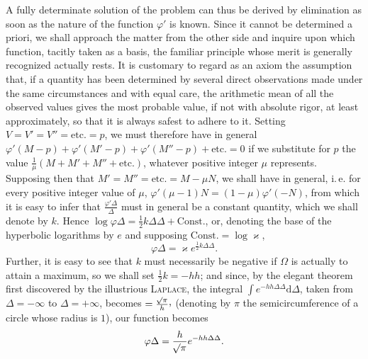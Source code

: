 A fully determinate solution of the problem can thus be derived by elimination as soon as the nature of the function $\varphi'$ is known. Since it cannot be determined a priori, we shall approach the matter from the other side and inquire upon which function, tacitly taken as a basis, the familiar principle whose merit is generally recognized actually rests. It is customary to regard as an axiom the assumption that, if a quantity has been determined by several direct observations made under the same circumstances and with equal care, the arithmetic mean of all the observed values gives the most probable value, if not with absolute rigor, at least approximately, so that it is always safest to adhere to it. Setting $V=V'=V''=\text{etc.}=p$, we must therefore have in general $\varphi'(M-p)+\varphi'(M'-p)+\varphi'(M''-p)+\text{etc.}=0$ if we substitute for $p$ the value $\frac{1}{\mu}(M+M'+M''+\text{etc.})$, whatever positive integer $\mu$ represents. Supposing then that $M'=M''=\text{etc.}=M-\mu N$, we shall have in general, i.\,e. for every positive integer value of $\mu$, $\varphi'(\mu-1)N=(1-\mu)\varphi'(-N)$, from which it is easy to infer that $\frac{\varphi'\Delta}{\Delta}$ must in general be a constant quantity, which we shall denote by $k$. Hence $\log\varphi\Delta=\tfrac12 k\Delta\Delta+\text{Const.}$, or, denoting the base of the hyperbolic logarithms by $e$ and supposing $\text{Const.}=\log\varkappa$,
\[
\varphi\Delta=\varkappa e^{\frac12 k\Delta\Delta}.
\]
Further, it is easy to see that $k$ must necessarily be negative if $\Omega$ is actually to attain a maximum, so we shall set $\tfrac12 k=-hh$; and since, by the elegant theorem first discovered by the illustrious \textsc{Laplace}, the integral $\int e^{-hh\Delta\Delta}\mathrm{d}\Delta$, taken from $\Delta=-\infty$ to $\Delta=+\infty$, becomes $=\frac{\BareRoot{\pi}}{h}\mathpunct{\raisebox{.45ex}{,}}$ (denoting by $\pi$ the semicircumference of a circle whose radius is $1$), our function becomes
\[
\varphi\Delta=\frac{h}{\mathord{{}^{}\!\surd}\pi}e^{-hh\Delta\Delta}.
\]
